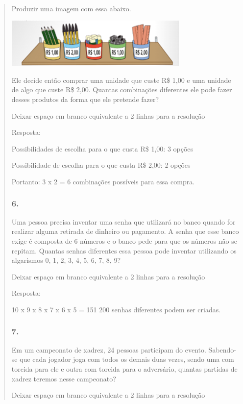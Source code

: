 \begin{enumerate}
\begin{escolha}
\begin{enumerate}
\begin{itemize}
\begin{itemize}
\begin{escolha}
\begin{quote}
\begin{escolha}
{Produzir uma imagem com essa abaixo.

\includegraphics[width=3.55864in,height=0.97508in]{media/image139.png}

Ele decide então comprar uma unidade que custe R\$ 1,00 e uma unidade de
algo que custe R\$ 2,00. Quantas combinações diferentes ele pode fazer
desses produtos da forma que ele pretende fazer?

Deixar espaço em branco equivalente a 2 linhas para a resolução

Resposta:

Possibilidades de escolha para o que custa R\$ 1,00: 3 opções

Possibilidade de escolha para o que custa R\$ 2,00: 2 opções

Portanto: 3 x 2 = 6 combinações possíveis para essa compra.

\subsubsection{6.}\label{section-135}

Uma pessoa precisa inventar uma senha que utilizará no banco quando for
realizar alguma retirada de dinheiro ou pagamento. A senha que esse
banco exige é composta de 6 números e o banco pede para que os números
não se repitam. Quantas senhas diferentes essa pessoa pode inventar
utilizando os algarismos 0, 1, 2, 3, 4, 5, 6, 7, 8, 9?

Deixar espaço em branco equivalente a 2 linhas para a resolução

Resposta:

10 x 9 x 8 x 7 x 6 x 5 = 151 200 senhas diferentes podem ser criadas.

\subsubsection{7.}\label{section-136}

Em um campeonato de xadrez, 24 pessoas participam do evento. Sabendo-se
que cada jogador joga com todos os demais duas vezes, sendo uma com
torcida para ele e outra com torcida para o adversário, quantas partidas
de xadrez teremos nesse campeonato?

Deixar espaço em branco equivalente a 2 linhas para a resolução

}
\end{escolha}
\end{quote}
\end{escolha}
\end{itemize}
\end{itemize}
\end{enumerate}
\end{escolha}
\end{enumerate}
